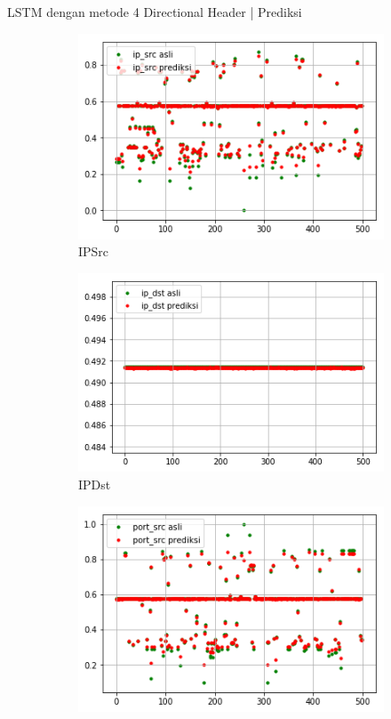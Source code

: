 \documentclass[t]{beamer}
\begin{document}
\begin{frame}{LSTM dengan metode 4 Directional Header | Prediksi}
    \begin{figure}[H]
    \begin{subfigure}[b]{.35\linewidth}
        \includegraphics[width=\textwidth]{public/assets/img/lstm4_svchosta_pred1.png}
        \caption{IPSrc}
    \end{subfigure}
    \begin{subfigure}[b]{.35\linewidth}
        \includegraphics[width=\textwidth]{public/assets/img/lstm4_svchosta_pred2.png}
        \caption{IPDst}
    \end{subfigure}
    \begin{subfigure}[b]{.35\linewidth}
        \includegraphics[width=\textwidth]{public/assets/img/lstm4_svchosta_pred3.png}

\end{subfigure}
\end{figure}
\end{frame}
\end{document}
